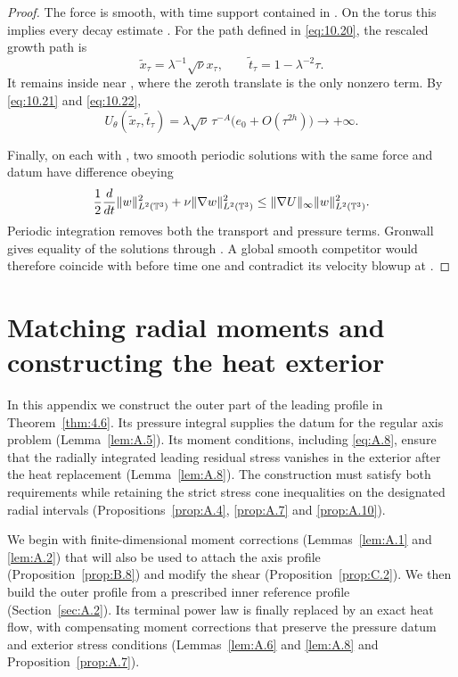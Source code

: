 \begin{proof}
%
The force is smooth, with time support contained in
. On the torus this implies every decay estimate
. For the path  defined in
\eqref{eq:10.20}, the rescaled growth path is
\[
  \widetilde x_\tau=\lambda^{-1}\sqrt\nu x_\tau,\qquad
  \widetilde t_\tau=1-\lambda^{-2}\tau.
\]
It remains inside  near , where the
zeroth translate is the only nonzero term. By \eqref{eq:10.21} and \eqref{eq:10.22},
\[
  U_\theta(\widetilde x_\tau,\widetilde t_\tau)
  =\lambda\sqrt\nu\,\tau^{-A}\bigl(e_0+O(\tau^{2h})\bigr)\longrightarrow+\infty.
\]

Finally, on each  with
, two smooth periodic solutions with the same force and datum
have difference  obeying
\[
  \frac12\frac{d}{dt}\|w\|_{L^2(\mathbb{T}^3)}^2
  +\nu\|\nabla w\|_{L^2(\mathbb{T}^3)}^2
  \leq\|\nabla U\|_\infty\|w\|_{L^2(\mathbb{T}^3)}^2.
\]
Periodic integration removes both the transport and pressure terms. Gronwall gives equality
of the solutions through . A global smooth competitor would
therefore coincide with  before time one and contradict its velocity
blowup at .
\end{proof}

\appendix
\section{Matching radial moments and constructing the heat exterior}\label{sec:A}
In this appendix we construct the outer part of the leading profile
 in Theorem~\ref{thm:4.6}. Its pressure integral supplies
the datum  for the regular axis problem
(Lemma~\ref{lem:A.5}). Its moment conditions, including \eqref{eq:A.8}, ensure that the
radially integrated leading residual stress  vanishes in the
exterior after the heat replacement (Lemma~\ref{lem:A.8}). The construction must satisfy
both requirements while retaining the strict stress cone inequalities on the designated
radial intervals (Propositions~\ref{prop:A.4}, \ref{prop:A.7} and \ref{prop:A.10}).

We begin with finite-dimensional moment corrections (Lemmas~\ref{lem:A.1} and
\ref{lem:A.2}) that will also be used to attach the axis profile
(Proposition~\ref{prop:B.8}) and modify the shear (Proposition~\ref{prop:C.2}). We then
build the outer profile from a prescribed inner reference profile (Section~\ref{sec:A.2}).
Its terminal power law  is finally replaced by an
exact heat flow, with compensating moment corrections that preserve the pressure datum and
exterior stress conditions (Lemmas~\ref{lem:A.6} and \ref{lem:A.8} and
Proposition~\ref{prop:A.7}).

